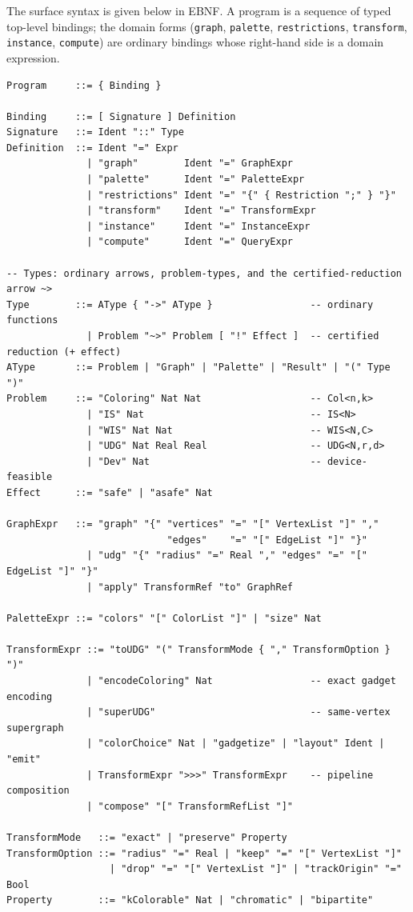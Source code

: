 \documentclass[11pt]{article}
\theoremstyle{definition}
\theoremstyle{remark}
\begin{document}
The surface syntax is given below in EBNF. A program is a sequence of typed top-level
bindings; the domain forms (\texttt{graph}, \texttt{palette}, \texttt{restrictions},
\texttt{transform}, \texttt{instance}, \texttt{compute}) are ordinary bindings whose
right-hand side is a domain expression.

\begin{lstlisting}[style=lang]
Program     ::= { Binding }

Binding     ::= [ Signature ] Definition
Signature   ::= Ident "::" Type
Definition  ::= Ident "=" Expr
              | "graph"        Ident "=" GraphExpr
              | "palette"      Ident "=" PaletteExpr
              | "restrictions" Ident "=" "{" { Restriction ";" } "}"
              | "transform"    Ident "=" TransformExpr
              | "instance"     Ident "=" InstanceExpr
              | "compute"      Ident "=" QueryExpr

-- Types: ordinary arrows, problem-types, and the certified-reduction arrow ~>
Type        ::= AType { "->" AType }                 -- ordinary functions
              | Problem "~>" Problem [ "!" Effect ]  -- certified reduction (+ effect)
AType       ::= Problem | "Graph" | "Palette" | "Result" | "(" Type ")"
Problem     ::= "Coloring" Nat Nat                   -- Col<n,k>
              | "IS" Nat                             -- IS<N>
              | "WIS" Nat Nat                        -- WIS<N,C>
              | "UDG" Nat Real Real                  -- UDG<N,r,d>
              | "Dev" Nat                            -- device-feasible
Effect      ::= "safe" | "asafe" Nat

GraphExpr   ::= "graph" "{" "vertices" "=" "[" VertexList "]" ","
                            "edges"    "=" "[" EdgeList "]" "}"
              | "udg" "{" "radius" "=" Real "," "edges" "=" "[" EdgeList "]" "}"
              | "apply" TransformRef "to" GraphRef

PaletteExpr ::= "colors" "[" ColorList "]" | "size" Nat

TransformExpr ::= "toUDG" "(" TransformMode { "," TransformOption } ")"
              | "encodeColoring" Nat                 -- exact gadget encoding
              | "superUDG"                           -- same-vertex supergraph
              | "colorChoice" Nat | "gadgetize" | "layout" Ident | "emit"
              | TransformExpr ">>>" TransformExpr    -- pipeline composition
              | "compose" "[" TransformRefList "]"

TransformMode   ::= "exact" | "preserve" Property
TransformOption ::= "radius" "=" Real | "keep" "=" "[" VertexList "]"
                  | "drop" "=" "[" VertexList "]" | "trackOrigin" "=" Bool
Property        ::= "kColorable" Nat | "chromatic" | "bipartite"


\end{lstlisting}
\end{document}
